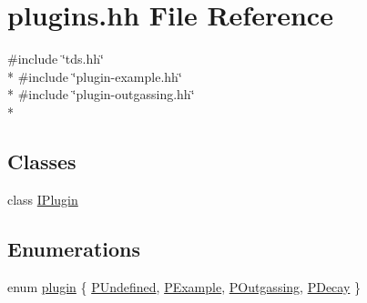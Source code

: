 \hypertarget{plugins_8hh}{\section{plugins.\-hh File Reference}
\label{plugins_8hh}
}
{\ttfamily \#include \char`\"{}tds.\-hh\char`\"{}}\\*
{\ttfamily \#include \char`\"{}plugin-\/example.\-hh\char`\"{}}\\*
{\ttfamily \#include \char`\"{}plugin-\/outgassing.\-hh\char`\"{}}\\*
\subsection*{Classes}
\begin{DoxyCompactItemize}
\item 
class \hyperlink{classIPlugin}{I\-Plugin}
\end{DoxyCompactItemize}
\subsection*{Enumerations}
\begin{DoxyCompactItemize}
\item 
enum \hyperlink{plugins_8hh_af34747f68f9b0963dea6e8f3c659659c}{plugin} \{ \hyperlink{plugins_8hh_af34747f68f9b0963dea6e8f3c659659caef8cc3c410b63a535fb02f123e74598c}{P\-Undefined}, 
\hyperlink{plugins_8hh_af34747f68f9b0963dea6e8f3c659659cae7e7cdab251a40e69029367fbcdd2ee0}{P\-Example}, 
\hyperlink{plugins_8hh_af34747f68f9b0963dea6e8f3c659659ca475137862bea404eee26ddf1633063e0}{P\-Outgassing}, 
\hyperlink{plugins_8hh_af34747f68f9b0963dea6e8f3c659659cad09e6b492f9f7d43bc62b1010747d94a}{P\-Decay}
 \}
\end{DoxyCompactItemize}


